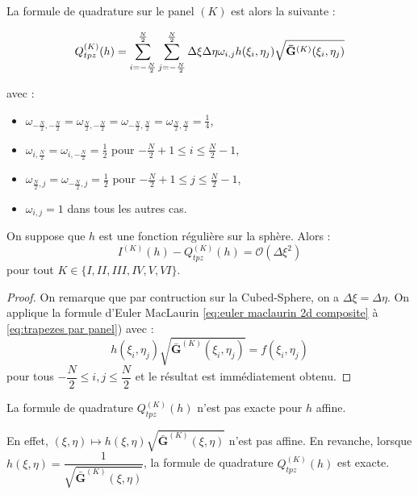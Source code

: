 La formule de quadrature sur le panel $(K)$ est alors la suivante :

\begin{equation}
Q_{tpz}^{(K)}(h)=\displaystyle\sum\limits_{i = -\frac{N}{2}}^{\frac{N}{2}}\displaystyle\sum\limits_{j = -\frac{N}{2}}^{\frac{N}{2}} \Delta \xi \Delta \eta \omega_{i,j} h(\xi_i, \eta_j) \sqrt{\mathbf{\bar{G}}^{(K)}(\xi_i, \eta_j)}
\label{eq:trapezes par panel}
\end{equation}

avec :

\begin{itemize}
\item $\omega_{-\frac{N}{2},-\frac{N}{2}}=\omega_{\frac{N}{2},-\frac{N}{2}}=\omega_{-\frac{N}{2},\frac{N}{2}}=\omega_{\frac{N}{2},\frac{N}{2}}=\frac{1}{4}$,
\item $\omega_{i,\frac{N}{2}}=\omega_{i,-\frac{N}{2}}=\frac{1}{2}$ pour $-\frac{N}{2}+1 \leq i \leq \frac{N}{2}-1$,
\item $\omega_{\frac{N}{2},j}=\omega_{-\frac{N}{2},j}=\frac{1}{2}$ pour $-\frac{N}{2}+1 \leq j \leq \frac{N}{2}-1$,
\item $\omega_{i,j}=1$ dans tous les autres cas.
\end{itemize}

\begin{proposition}
On suppose que $h$ est une fonction régulière sur la sphère. Alors :
\begin{equation}
I^{(K)}(h) - Q_{tpz}^{(K)}(h) = \mathcal{O} \left( \Delta \xi^2 \right)
\end{equation}
pour tout $K \in \lbrace I, II, III, IV, V, VI \rbrace$.
\label{prop:consistance tpz panel}
\end{proposition}

\begin{proof}
On remarque que par contruction sur la Cubed-Sphere, on a $\Delta \xi = \Delta \eta$.
On applique la formule d'Euler MacLaurin \eqref{eq:euler maclaurin 2d composite} à \eqref{eq:trapezes par panel}) avec :
\begin{equation}
h(\xi_i, \eta_j) \sqrt{\mathbf{\bar{G}}^{(K)}(\xi_i, \eta_j)} = f(\xi_i,\eta_j)
\end{equation}
pour tous $-\dfrac{N}{2} \leq i,j \leq \dfrac{N}{2}$ et le résultat est immédiatement obtenu.
\end{proof}

\begin{remarque}
La formule de quadrature $Q_{tpz}^{(K)}(h)$ n'est pas exacte pour $h$ affine.

En effet, $(\xi,\eta) \mapsto h(\xi, \eta) \sqrt{\mathbf{\bar{G}}^{(K)}(\xi, \eta)}$ n'est pas affine.
En revanche, lorsque $h(\xi,\eta)=\dfrac{1}{\sqrt{\mathbf{\bar{G}}^{(K)}(\xi, \eta)}}$, la formule de quadrature $Q_{tpz}^{(K)}(h)$ est exacte.
\end{remarque}

